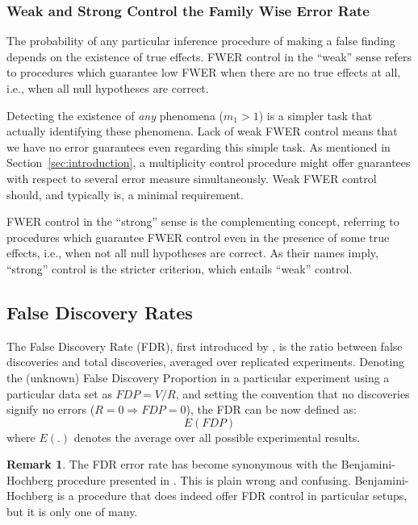 \documentclass[review,12pt]{article}
\theoremstyle{definition}
\theoremstyle{definition}
\newtheorem{remark}{Remark}[section]
\begin{document}
\subsubsection{Weak and Strong Control the Family Wise Error Rate}
The probability of any particular inference procedure of making a false finding depends on the existence of true effects. FWER control in the ``weak'' sense refers to procedures which guarantee low FWER when there are no true effects at all, i.e., when all null hypotheses are correct. 

Detecting the existence of \emph{any} phenomena ($m_1>1$) is a simpler task that actually identifying these phenomena. Lack of weak FWER control means that we have no error guarantees even regarding this simple task. 
As mentioned in Section~\ref{sec:introduction}, a multiplicity control procedure might offer guarantees with respect to several error measure simultaneously. Weak FWER control should, and typically is, a minimal requirement. 

FWER control in the ``strong'' sense is the complementing concept, referring to procedures which guarantee FWER control even in the presence of some true effects, i.e., when not all null hypotheses are correct. 
As their names imply, ``strong'' control is the stricter criterion, which entails ``weak'' control.




\subsection{\label{sub:fdr}False Discovery Rates}

The False Discovery Rate (FDR), first introduced by \citet{benjamini_controlling_1995}, is the ratio between false discoveries and total discoveries, averaged over replicated experiments. 
Denoting the (unknown) False Discovery Proportion in a particular experiment using a particular data set as $ FDP=V/R $, and setting the convention that no discoveries signify no errors ($R=0 \Rightarrow FDP=0$), the FDR can be now defined as:
$$E \left( FDP \right)$$ 
where $E(.)$ denotes the average over all possible experimental results.


\begin{remark}
The FDR error rate has become synonymous with the Benjamini-Hochberg procedure presented in \citep{benjamini_controlling_1995} . This is plain wrong and confusing. Benjamini-Hochberg is a procedure that does indeed offer FDR control in particular setups, but it is only one of many.
\end{remark}
\end{document}
